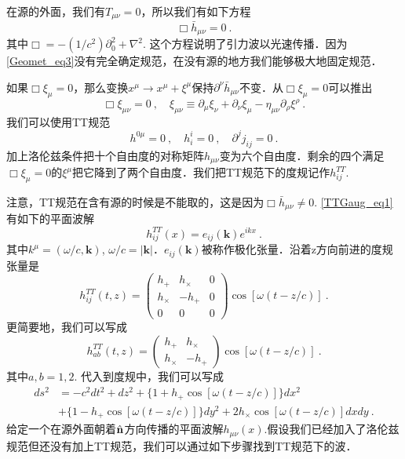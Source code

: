 
\begin{issues}
\issueNeedCite
\issueMissDepend
\end{issues}

在源的外面，我们有$T_{\mu\nu} = 0$，所以我们有如下方程
\begin{equation}\label{TTGaug_eq1}
\Box \bar h_{\mu\nu} = 0 ~.
\end{equation}
其中$\Box = - (1/c^2) \partial_0^2 +\nabla^2$. 这个方程说明了引力波以光速传播．因为\autoref{Geomet_eq3}没有完全确定规范，在没有源的地方我们能够极大地固定规范．

如果$\Box \xi_\mu = 0$，那么变换$x^\mu \rightarrow x^\mu+\xi^\mu$保持$\partial^\nu \bar h_{\mu\nu}$不变．从$\Box \xi_\mu = 0$可以推出
\begin{equation}
\Box \xi_{\mu\nu} = 0~, \quad \xi_{\mu\nu} \equiv \partial_{\mu} \xi_\nu +\partial_\nu \xi_\mu - \eta_{\mu\nu} \partial_\rho\xi^\rho~. 
\end{equation}
我们可以使用TT规范
\begin{equation}
h^{0\mu} = 0~, \quad h^i_i = 0~, \quad \partial^j j_{ij} = 0~.
\end{equation}
加上洛伦兹条件把十个自由度的对称矩阵$h_{\mu\nu}$变为六个自由度．剩余的四个满足$\Box \xi_\mu = 0$的$\xi^\mu$把它降到了两个自由度．我们把TT规范下的度规记作$h_{ij}^{TT}$. 

注意，TT规范在含有源的时候是不能取的，这是因为$\Box \bar h_{\mu\nu} \neq 0$. \autoref{TTGaug_eq1}有如下的平面波解
\begin{equation}
h_{ij}^{TT} (x) = e_{ij} (\mathbf k) e^{ikx} ~.  
\end{equation}
其中$k^\mu = (\omega/c,\mathbf k)$, $\omega/c = |\mathbf k|$．$e_{ij}(\mathbf k)$被称作极化张量．沿着z方向前进的度规张量是
\begin{equation}
h_{ij}^{TT} (t,z) = 
\begin{pmatrix}
h_+ & h_\times & 0 \\
h_\times & - h_+ & 0 \\
0 & 0 & 0
\end{pmatrix} \cos [\omega (t - z/c)]~. 
\end{equation}
更简要地，我们可以写成
\begin{equation}\label{TTGaug_eq2}
h_{ab}^{TT} (t,z) = 
\begin{pmatrix}
h_+ & h_\times   \\
h_\times & - h_+   
\end{pmatrix} \cos [\omega (t - z/c)]~. 
\end{equation}
其中$a,b = 1,2$. 代入到度规中，我们可以写成
\begin{equation}
\begin{aligned}
ds^2 & = - c^2 dt^2 + dz^2 + \{ 1+ h_+ \cos [\omega(t-z/c)] \} dx^2 \\
& + \{ 1-h_+ \cos [\omega(t-z/c)] \} dy^2 + 2 h_\times \cos[\omega(t-z/c)] dx dy~.
\end{aligned}
\end{equation}
给定一个在源外面朝着$\hat{\bf{n}}$方向传播的平面波解$h_{\mu\nu}(x)$.假设我们已经加入了洛伦兹规范但还没有加上TT规范，我们可以通过如下步骤找到TT规范下的波．

